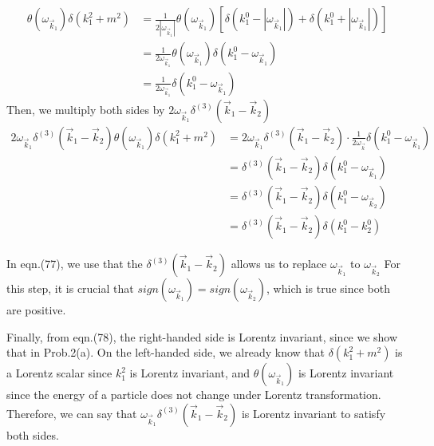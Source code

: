 \documentclass[11pt, a4paper]{article}
\begin{document}
\begin{align}
    \theta(\omega_{\vec{k}_1})\delta(k^2_1 + m^2) & = \frac{1}{2|\omega_{\vec{k}_1}|} \theta(\omega_{\vec{k}_1})\left[ \delta(k^0_1 - |\omega_{\vec{k}_1}|) + \delta(k^0_1 + |\omega_{\vec{k}_1}|) \right] \\
    & = \frac{1}{2\omega_{\vec{k}_1}} \theta(\omega_{\vec{k}_1})\delta(k^0_1 - \omega_{\vec{k}_1}) \\
    & = \frac{1}{2\omega_{\vec{k}_1}} \delta(k^0_1 - \omega_{\vec{k}_1})
\end{align}
Then, we multiply both sides by $2\omega_{\vec{k}_1} \delta^{(3)}(\vec{k}_1 - \vec{k}_2)$
\begin{align}
    2\omega_{\vec{k}_1} \delta^{(3)}(\vec{k}_1 - \vec{k}_2)\theta(\omega_{\vec{k}_1})\delta(k^2_1 + m^2) & = 2\omega_{\vec{k}_1} \delta^{(3)}(\vec{k}_1 - \vec{k}_2) \cdot \frac{1}{2\omega_{\vec{k}}} \delta(k^0_1 - \omega_{\vec{k}_1}) \\
    & = \delta^{(3)}(\vec{k}_1 - \vec{k}_2)\delta(k^0_1 - \omega_{\vec{k}_1}) \\
    & = \delta^{(3)}(\vec{k}_1 - \vec{k}_2)\delta(k^0_1 - \omega_{\vec{k}_2}) \\
    & = \delta^{(3)}(\vec{k}_1 - \vec{k}_2)\delta(k^0_1 - k^0_2)
\end{align}

In eqn.(77), we use that the $\delta^{(3)}(\vec{k}_1 - \vec{k}_2)$ allows us to replace $\omega_{\vec{k}_1}$ to $\omega_{\vec{k}_2}$
For this step, it is crucial that $sign(\omega_{\vec{k}_1}) = sign(\omega_{\vec{k}_2})$, which is true since both are positive.

Finally, from eqn.(78), the right-handed side is Lorentz invariant, since we show that in Prob.2(a).
On the left-handed side, we already know that $\delta(k^2_1 + m^2)$ is a Lorentz scalar since $k^2_1$ is Lorentz invariant, and $\theta(\omega_{\vec{k}_1})$ is Lorentz invariant since the energy of a particle does not change under Lorentz transformation. 
Therefore, we can say that $\omega_{\vec{k}_1}\delta^{(3)}(\vec{k}_1 - \vec{k}_2)$ is Lorentz invariant to satisfy both sides.
\end{document}
